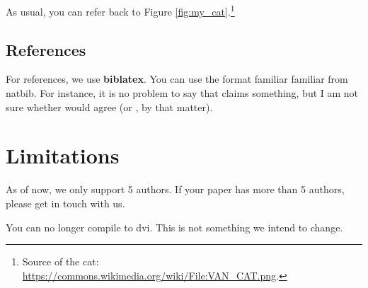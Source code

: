 As usual, you can refer back to Figure \ref{fig:my_cat}.\footnote{Source of the cat: \href{https://commons.wikimedia.org/wiki/File:VAN_CAT.png}{https://commons.wikimedia.org/wiki/File:VAN\_CAT.png}.}

\subsection{References}

For references, we use \textbf{biblatex}. You can use the format familiar familiar from natbib. For instance, it is no problem to say that \citet[451]{Szadrowsky:1936} claims something, but I am not sure whether \citet[70]{Kamp:1973} would agree (or \citealt[50]{Searle:1964}, by that matter).


\section{Limitations}

As of now, we only support 5 authors. If your paper has more than 5 authors, please get in touch with us.

You can no longer compile to dvi. This is not something we intend to change.



